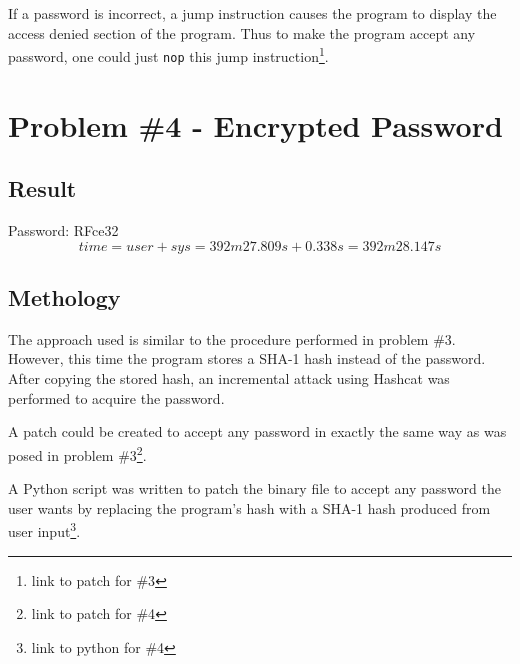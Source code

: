 \documentclass[conference]{IEEEtran}
\begin{document}
If a password is incorrect, a jump instruction causes the program to display the
access denied section of the program. Thus to make the program accept any
password, one could just \texttt{nop} this jump instruction\footnote{link to
patch for \#3}.

\section{Problem \#4 - Encrypted Password}
\subsection{Result}
  \noindent Password: RFce32
  \begin{displaymath}
  time = user + sys = 392m27.809s + 0.338s = 392m28.147s
  \end{displaymath}

\subsection{Methology}
The approach used is similar to the procedure performed in problem \#3. However,
this time the program stores a SHA-1 hash instead of the password. After copying
the stored hash, an incremental attack using Hashcat was performed to acquire
the password.

A patch could be created to accept any password in exactly the same way as was
posed in problem \#3\footnote{link to patch for \#4}.

A Python script was written to patch the binary file to accept any password the
user wants by replacing the program's hash with a SHA-1 hash produced from user
input\footnote{link to python for \#4}.
\end{document}
